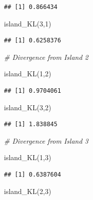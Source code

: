 \documentclass[
]{book}
\newenvironment{Shaded}{\begin{snugshade}}{\end{snugshade}}
\newcommand{\CommentTok}[1]{\textcolor[rgb]{0.56,0.35,0.01}{\textit{#1}}}
\newcommand{\DecValTok}[1]{\textcolor[rgb]{0.00,0.00,0.81}{#1}}
\newcommand{\FunctionTok}[1]{\textcolor[rgb]{0.00,0.00,0.00}{#1}}
\newcommand{\NormalTok}[1]{#1}
\begin{document}
\begin{verbatim}
## [1] 0.866434
\end{verbatim}

\begin{Shaded}
\begin{Highlighting}[]
\FunctionTok{island\_KL}\NormalTok{(}\DecValTok{3}\NormalTok{,}\DecValTok{1}\NormalTok{)}
\end{Highlighting}
\end{Shaded}

\begin{verbatim}
## [1] 0.6258376
\end{verbatim}

\begin{Shaded}
\begin{Highlighting}[]
\CommentTok{\# Divergence from Island 2}

\FunctionTok{island\_KL}\NormalTok{(}\DecValTok{1}\NormalTok{,}\DecValTok{2}\NormalTok{)}
\end{Highlighting}
\end{Shaded}

\begin{verbatim}
## [1] 0.9704061
\end{verbatim}

\begin{Shaded}
\begin{Highlighting}[]
\FunctionTok{island\_KL}\NormalTok{(}\DecValTok{3}\NormalTok{,}\DecValTok{2}\NormalTok{)}
\end{Highlighting}
\end{Shaded}

\begin{verbatim}
## [1] 1.838845
\end{verbatim}

\begin{Shaded}
\begin{Highlighting}[]
\CommentTok{\# Divergence from Island 3}

\FunctionTok{island\_KL}\NormalTok{(}\DecValTok{1}\NormalTok{,}\DecValTok{3}\NormalTok{)}
\end{Highlighting}
\end{Shaded}

\begin{verbatim}
## [1] 0.6387604
\end{verbatim}

\begin{Shaded}
\begin{Highlighting}[]
\FunctionTok{island\_KL}\NormalTok{(}\DecValTok{2}\NormalTok{,}\DecValTok{3}\NormalTok{)}
\end{Highlighting}
\end{Shaded}
\end{document}
